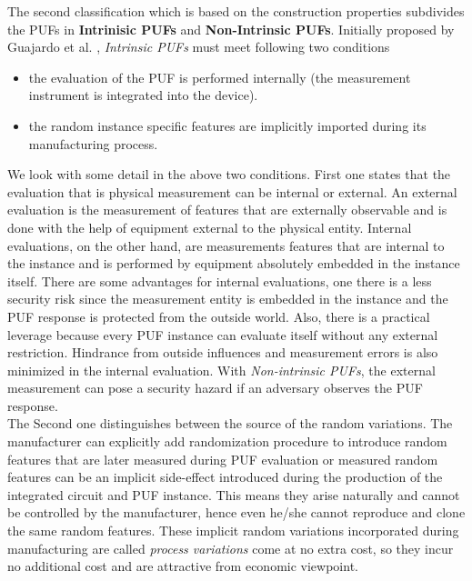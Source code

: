 The second classification which is based on the construction properties subdivides the PUFs in \textbf{Intrinisic PUFs} and \textbf{Non-Intrinsic PUFs}. Initially proposed by Guajardo et al. \cite{11}, \emph{Intrinsic PUFs} must meet following two conditions
\begin{itemize}
	\item the evaluation of the PUF is performed internally (the measurement instrument is integrated into the device).
	\item the random instance specific features are implicitly imported during its manufacturing process.
\end{itemize}

We look with some detail in the above two conditions. First one states that the evaluation that is physical measurement can be internal or external. An external evaluation is the measurement of features that are externally observable and is done with the help of equipment external to the physical entity. Internal evaluations, on the other hand, are measurements features that are internal to the instance and is performed by equipment absolutely embedded in the instance itself. There are some
advantages for internal evaluations, one there is a less security risk since the measurement entity is embedded in the instance and the PUF response is protected from the outside world. Also, there is a practical leverage because every PUF instance can evaluate itself without any external restriction. Hindrance from outside influences and measurement errors is also minimized in the internal evaluation. With \emph{Non-intrinsic PUFs}, the external measurement can pose a security
hazard if an adversary observes the PUF response.\\

The Second one distinguishes between the source of the random variations. The manufacturer can explicitly add randomization procedure to introduce random features that are later measured during PUF evaluation or measured random features can be an implicit side-effect introduced during the production of the integrated circuit and PUF instance. This means they arise naturally and cannot be controlled by the manufacturer, hence even he/she cannot reproduce and clone the same random features. These
implicit random variations incorporated during manufacturing are called \emph{process variations} come at no extra cost, so they incur no additional cost and are attractive from economic viewpoint.\\

